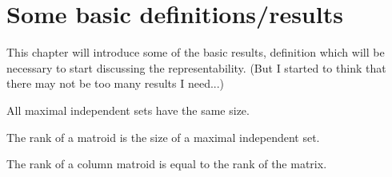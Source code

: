 \section{Some basic definitions/results}

This chapter will introduce some of the basic results, definition which will be necessary to start discussing the representability.
(But I started to think that there may not be too many results I need...)

\begin{thm}
All maximal independent sets have the same size.
\end{thm}

\begin{defn}
The rank of a matroid is the size of a maximal independent set.
\end{defn}


\begin{defn}
The rank of a column matroid is equal to the rank of the matrix.
\end{defn}
